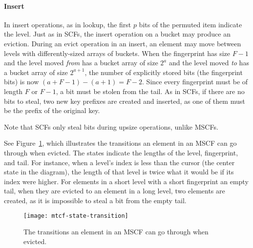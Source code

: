\documentclass[letterpaper,twocolumn,10pt]{article}
\newcommand{\TCF}{SCF}
\newcommand{\MTCF}{MSCF}
\newcommand{\TCF}{TCF}
\newcommand{\MTCF}{MTCF}
\begin{document}


\paragraph{Insert}
In insert operations, as in lookup, the first $p$ bits of the permuted item indicate the level. %
Just as in \TCF{}s, the insert operation on a bucket may produce an eviction. %
During an evict operation in an insert, an element may move between levels with differently-sized arrays of buckets.
When the fingerprint has size $F-1$ and the level moved {\em from} has a bucket array of size $2^a$ and the level moved {\em to} has a bucket array of size $2^{a+1}$, the number of explicitly stored bits (the fingerprint bits) is now $(a + F - 1) - (a+1) = F - 2$.
Since every fingerprint must be of length $F$ or $F-1$, a bit must be stolen from the tail. %
As in \TCF{}s, if there are no bits to steal, two new key prefixes are created and inserted, as one of them must be the prefix of the original key. %

Note that \TCF{}s only steal bits during upsize operations, unlike \MTCF{}s.

See Figure~\ref{mtcf-state-transition}, which illustrates the transitions an element in an \MTCF{} can go through when evicted.
The states indicate the lengths of the level, fingerprint, and tail.
For instance, when a level's index is less than the cursor (the center state in the diagram), the length of that level is twice what it would be if its index were higher.
For elements in a short level with a short fingerprint an empty tail, when they are evicted to an element in a long level, two elements are created, as it is impossible to steal a bit from the empty tail.


\begin{figure}[b!]
  \texttt{[image: mtcf-state-transition]}
\caption{\label{mtcf-state-transition}
The transitions an element in an \MTCF{} can go through when evicted.
}
\end{figure}
\end{document}
